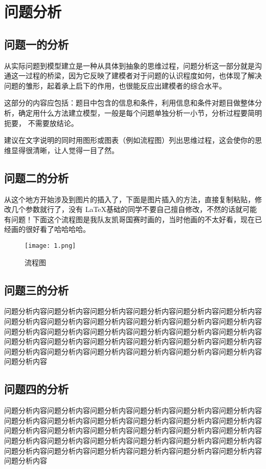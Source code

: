 \section{问题分析}

\subsection{问题一的分析}

从实际问题到模型建立是一种从具体到抽象的思维过程，问题分析这一部分就是沟通这一过程的桥梁，因为它反映了建模者对于问题的认识程度如何，也体现了解决问题的雏形，起着承上启下的作用，也很能反应出建模者的综合水平。

这部分的内容应包括：题目中包含的信息和条件，利用信息和条件对题目做整体分析，确定用什么方法建立模型，一般是每个问题单独分析一小节，分析过程要简明扼要， 不需要放结论。

建议在文字说明的同时用图形或图表（例如流程图）列出思维过程，这会使你的思维显得很清晰，让人觉得一目了然。


\subsection{问题二的分析}

从这个地方开始涉及到图片的插入了，下面是图片插入的方法，直接复制粘贴，修改几个参数就行了，没有 \LaTeX 基础的同学不要自己擅自修改，不然的话就可能有问题！下面这个流程图是我队友凯哥国赛时画的，当时他画的不太好看，现在已经画的很好看了哈哈哈哈。

\begin{figure}[H] %
	\centering %
	\texttt{[image: 1.png]} 
	\caption{流程图} 
	\label{Fig.main1} 
\end{figure}

\subsection{问题三的分析}

问题分析内容问题分析内容问题分析内容问题分析内容问题分析内容问题分析内容问题分析内容问题分析内容问题分析内容问题分析内容问题分析内容问题分析内容问题分析内容问题分析内容问题分析内容问题分析内容问题分析内容问题分析内容问题分析内容问题分析内容问题分析内容问题分析内容问题分析内容问题分析内容问题分析内容问题分析内容问题分析内容问题分析内容问题分析内容问题分析内容问题分析内容


\subsection{问题四的分析}

问题分析内容问题分析内容问题分析内容问题分析内容问题分析内容问题分析内容问题分析内容问题分析内容问题分析内容问题分析内容问题分析内容问题分析内容问题分析内容问题分析内容问题分析内容问题分析内容问题分析内容问题分析内容问题分析内容问题分析内容问题分析内容问题分析内容问题分析内容问题分析内容问题分析内容问题分析内容问题分析内容问题分析内容问题分析内容问题分析内容问题分析内容

